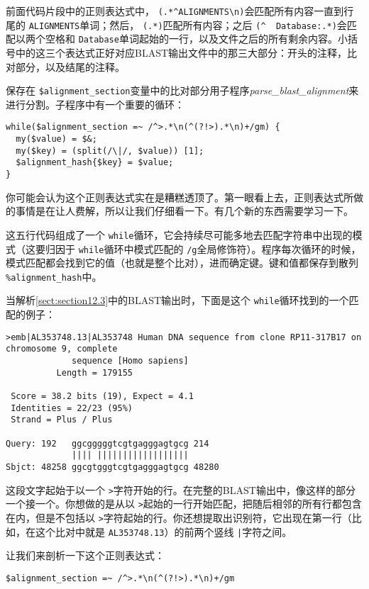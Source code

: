 前面代码片段中的正则表达式中， \verb|(.*^ALIGNMENTS\n)|会匹配所有内容一直到行尾的 \verb|ALIGNMENTS|单词；然后， \verb|(.*)|匹配所有内容；之后 \verb|(^  Database:.*)|会匹配以两个空格和 \verb|Database|单词起始的一行，以及文件之后的所有剩余内容。小括号中的这三个表达式正好对应BLAST输出文件中的那三大部分：开头的注释，比对部分，以及结尾的注释。

保存在 \verb|$alignment_section|变量中的比对部分用子程序\textit{parse\_blast\_alignment}来进行分割。子程序中有一个重要的循环：

\begin{lstlisting}
while($alignment_section =~ /^>.*\n(^(?!>).*\n)+/gm) {
  my($value) = $&;
  my($key) = (split(/\|/, $value)) [1];
  $alignment_hash{$key} = $value;
}
\end{lstlisting}

你可能会认为这个正则表达式实在是糟糕透顶了。第一眼看上去，正则表达式所做的事情是在让人费解，所以让我们仔细看一下。有几个新的东西需要学习一下。

这五行代码组成了一个 \verb|while|循环，它会持续尽可能多地去匹配字符串中出现的模式（这要归因于 \verb|while|循环中模式匹配的 \verb|/g|全局修饰符）。程序每次循环的时候，模式匹配都会找到它的值（也就是整个比对），进而确定键。键和值都保存到散列 \verb|%alignment_hash|中。

当解析\autoref{sect:section12.3}中的BLAST输出时，下面是这个 \verb|while|循环找到的一个匹配的例子：

\begin{lstlisting}
>emb|AL353748.13|AL353748 Human DNA sequence from clone RP11-317B17 on
chromosome 9, complete
             sequence [Homo sapiens]
          Length = 179155

 Score = 38.2 bits (19), Expect = 4.1
 Identities = 22/23 (95%)
 Strand = Plus / Plus

Query: 192   ggcgggggtcgtgagggagtgcg 214
             |||| ||||||||||||||||||
Sbjct: 48258 ggcgtgggtcgtgagggagtgcg 48280
\end{lstlisting}

这段文字起始于以一个 \verb|>|字符开始的行。在完整的BLAST输出中，像这样的部分一个接一个。你想做的是从以 \verb|>|起始的一行开始匹配，把随后相邻的所有行都包含在内，但是不包括以 \verb|>|字符起始的行。你还想提取出识别符，它出现在第一行（比如，在这个比对中就是 \verb|AL353748.13|）的前两个竖线 \verb=|=字符之间。

让我们来剖析一下这个正则表达式：

\begin{lstlisting}
$alignment_section =~ /^>.*\n(^(?!>).*\n)+/gm
\end{lstlisting}


